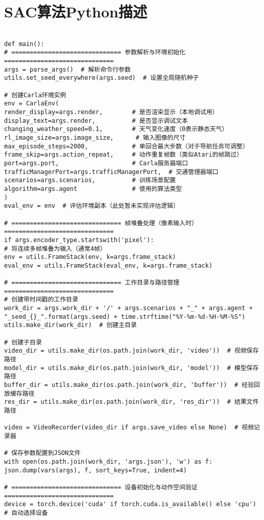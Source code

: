 \section{SAC算法Python描述}
\begin{lstlisting}
	
def main():
# ============================== 参数解析与环境初始化 ==============================
args = parse_args()  # 解析命令行参数
utils.set_seed_everywhere(args.seed)  # 设置全局随机种子

# 创建Carla环境实例
env = CarlaEnv(
render_display=args.render,        # 是否渲染显示（本地调试用）
display_text=args.render,          # 是否显示调试文本
changing_weather_speed=0.1,        # 天气变化速度（0表示静态天气）
rl_image_size=args.image_size,      # 输入图像的尺寸
max_episode_steps=2000,            # 单回合最大步数（对于导航任务可调整）
frame_skip=args.action_repeat,     # 动作重复帧数（类似Atari的帧跳过）
port=args.port,                    # Carla服务器端口
trafficManagerPort=args.trafficManagerPort,  # 交通管理器端口
scenarios=args.scenarios,          # 训练场景配置
algorithm=args.agent               # 使用的算法类型
)
eval_env = env  # 评估环境副本（此处暂未实现评估逻辑）

# ============================== 帧堆叠处理（像素输入时） ==============================
if args.encoder_type.startswith('pixel'):
# 将连续多帧堆叠为输入（通常4帧）
env = utils.FrameStack(env, k=args.frame_stack)
eval_env = utils.FrameStack(eval_env, k=args.frame_stack)

# ============================== 工作目录与路径管理 ==============================
# 创建带时间戳的工作目录
work_dir = args.work_dir + '/' + args.scenarios + "_" + args.agent + "_seed_{}_".format(args.seed) + time.strftime("%Y-%m-%d-%H-%M-%S")
utils.make_dir(work_dir)  # 创建主目录

# 创建子目录
video_dir = utils.make_dir(os.path.join(work_dir, 'video'))  # 视频保存路径
model_dir = utils.make_dir(os.path.join(work_dir, 'model'))  # 模型保存路径
buffer_dir = utils.make_dir(os.path.join(work_dir, 'buffer'))  # 经验回放缓存路径
res_dir = utils.make_dir(os.path.join(work_dir, 'res_dir'))  # 结果文件路径

video = VideoRecorder(video_dir if args.save_video else None)  # 视频记录器

# 保存参数配置到JSON文件
with open(os.path.join(work_dir, 'args.json'), 'w') as f:
json.dump(vars(args), f, sort_keys=True, indent=4)

# ============================== 设备初始化与动作空间验证 ==============================
device = torch.device('cuda' if torch.cuda.is_available() else 'cpu')  # 自动选择设备


\end{lstlisting}
